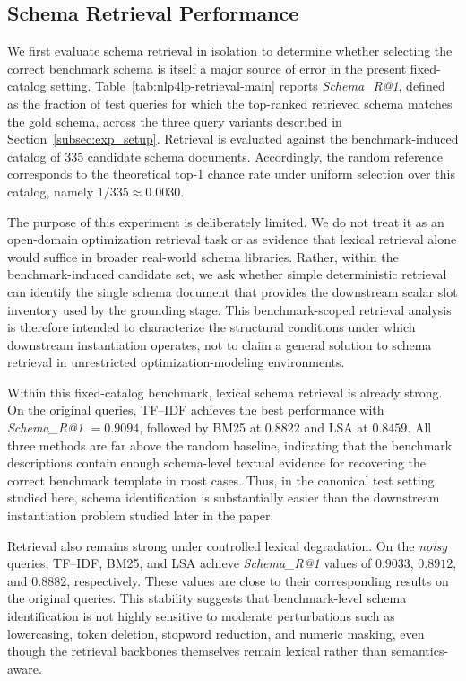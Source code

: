 \documentclass[pdflatex,sn-basic,Numbered]{sn-jnl}
\begin{document}
\subsection{Schema Retrieval Performance}
\label{subsec:exp_retrieval}

We first evaluate schema retrieval in isolation to determine whether selecting the correct benchmark schema is itself a major source of error in the present fixed-catalog setting. Table~\ref{tab:nlp4lp-retrieval-main} reports \textit{Schema\_R@1}, defined as the fraction of test queries for which the top-ranked retrieved schema matches the gold schema, across the three query variants described in Section~\ref{subsec:exp_setup}. Retrieval is evaluated against the benchmark-induced catalog of 335 candidate schema documents. Accordingly, the random reference corresponds to the theoretical top-1 chance rate under uniform selection over this catalog, namely $1/335 \approx 0.0030$.

The purpose of this experiment is deliberately limited. We do not treat it as an open-domain optimization retrieval task or as evidence that lexical retrieval alone would suffice in broader real-world schema libraries. Rather, within the benchmark-induced candidate set, we ask whether simple deterministic retrieval can identify the single schema document that provides the downstream scalar slot inventory used by the grounding stage. This benchmark-scoped retrieval analysis is therefore intended to characterize the structural conditions under which downstream instantiation operates, not to claim a general solution to schema retrieval in unrestricted optimization-modeling environments.

Within this fixed-catalog benchmark, lexical schema retrieval is already strong. On the original queries, TF--IDF achieves the best performance with \textit{Schema\_R@1} $= 0.9094$, followed by BM25 at $0.8822$ and LSA at $0.8459$. All three methods are far above the random baseline, indicating that the benchmark descriptions contain enough schema-level textual evidence for recovering the correct benchmark template in most cases. Thus, in the canonical test setting studied here, schema identification is substantially easier than the downstream instantiation problem studied later in the paper.

Retrieval also remains strong under controlled lexical degradation. On the \emph{noisy} queries, TF--IDF, BM25, and LSA achieve \textit{Schema\_R@1} values of $0.9033$, $0.8912$, and $0.8882$, respectively. These values are close to their corresponding results on the original queries. This stability suggests that benchmark-level schema identification is not highly sensitive to moderate perturbations such as lowercasing, token deletion, stopword reduction, and numeric masking, even though the retrieval backbones themselves remain lexical rather than semantics-aware.
\end{document}
